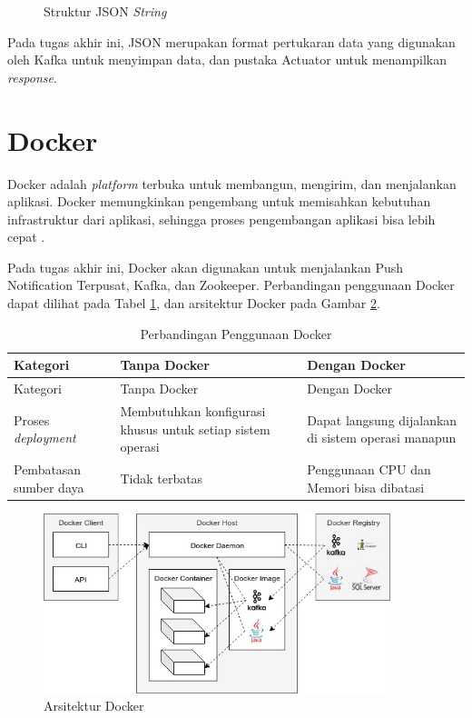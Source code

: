\begin{enumerate}[listparindent=2.5em]
\begin{figure}[H]
    	\caption{Struktur JSON \textit{String}} \label{img:json-string}
    \end{figure}
\end{enumerate}
\par Pada tugas akhir ini, JSON merupakan format pertukaran data yang digunakan oleh Kafka untuk menyimpan data, dan pustaka Actuator untuk menampilkan \textit{response}.

\section{Docker}
\par Docker adalah \textit{platform} terbuka untuk membangun, mengirim, dan menjalankan aplikasi. Docker memungkinkan pengembang untuk memisahkan kebutuhan infrastruktur dari aplikasi, sehingga proses pengembangan aplikasi bisa lebih cepat \cite{docker-online}.
\par Pada tugas akhir ini, Docker akan digunakan untuk menjalankan Push Notification Terpusat, Kafka, dan Zookeeper. Perbandingan penggunaan Docker dapat dilihat pada Tabel \ref{t:perbandingan_docker}, dan arsitektur Docker pada Gambar \ref{img:arsitektur-docker}.
\begin{longtable}{|p{2.5cm}|p{3.5cm}|p{3.5cm}|}
	\caption{Perbandingan Penggunaan Docker} \label{t:perbandingan_docker} \\ \hline
	\rowcolor{lightgray} Kategori & Tanpa Docker & Dengan Docker \\ \hline
	\endfirsthead
	\hline
	\rowcolor{lightgray} Kategori & Tanpa Docker & Dengan Docker \\ \hline
	\endhead
	Proses \textit{deployment} & Membutuhkan konfigurasi khusus untuk setiap sistem operasi & Dapat langsung dijalankan di sistem operasi manapun \\ \hline
	Pembatasan sumber daya & Tidak terbatas & Penggunaan CPU dan Memori bisa dibatasi \\ \hline
\end{longtable}
\begin{figure}[H]
\centering\includegraphics[width=0.9\textwidth]{bab2/img/arsitektur-docker.jpg}
\caption{Arsitektur Docker}
\label{img:arsitektur-docker}
\end{figure}

